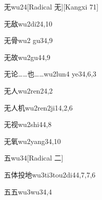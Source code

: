 \begin{verbete}{无}{wu2}{4}[Radical 无][Kangxi 71]
\end{verbete}

\begin{verbete}{无敌}{wu2di2}{4,10}
\end{verbete}

\begin{verbete}{无骨}{wu2 gu3}{4,9}
\end{verbete}

\begin{verbete}{无故}{wu2gu4}{4,9}
\end{verbete}

\begin{verbete}{无论……也……}{wu2lun4 ye3}{4,6,3}
\end{verbete}

\begin{verbete}{无人}{wu2ren2}{4,2}
\end{verbete}

\begin{verbete}{无人机}{wu2ren2ji1}{4,2,6}
\end{verbete}

\begin{verbete}{无视}{wu2shi4}{4,8}
\end{verbete}

\begin{verbete}{无氧}{wu2yang3}{4,10}
\end{verbete}

\begin{verbete}{五}{wu3}{4}[Radical 二]
\end{verbete}

\begin{verbete}{五体投地}{wu3ti3tou2di4}{4,7,7,6}
\end{verbete}

\begin{verbete}{五五}{wu3wu3}{4,4}
\end{verbete}

